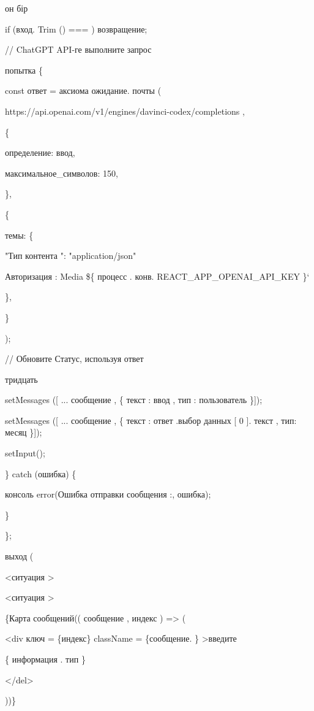 он бір

if (вход. Trim () === \textquotesingle\textquotesingle) возвращение;

// ChatGPT API-ге выполните запрос

попытка \{

const ответ = аксиома ожидание. почты (

\textquotesingle https://api.openai.com/v1/engines/davinci-codex/completions\textquotesingle{}
,

\{

определение: ввод,

максимальное\_символов: 150,

\},

\{

темы: \{

"Тип контента ": "application/json"

\textquotesingle Авторизация\textquotesingle{} : \textquotesingle Media
\$\{ процесс . конв. REACT\_APP\_OPENAI\_API\_KEY \}`

\},

\}

);

// Обновите Статус, используя ответ

тридцать

setMessages ({[} ... сообщение , \{ текст : ввод , тип :
\textquotesingle пользователь\textquotesingle{} \}{]});

setMessages ({[} ... сообщение , \{ текст : ответ .выбор данных {[} 0
{]}. текст , тип: \textquotesingle месяц\textquotesingle{} \}{]});

setInput(\textquotesingle\textquotesingle);

\} catch (ошибка) \{

консоль error(\textquotesingle\textquotesingle Ошибка отправки сообщения
:\textquotesingle, ошибка);

\}

\};

выход (

\textless ситуация \textgreater{}

\textless ситуация \textgreater{}

\{Карта сообщений(( сообщение , индекс ) =\textgreater{} (

\textless div ключ = \{индекс\} className = \{сообщение. \}
\textgreater введите

\{ информация . тип \}

\textless/del\textgreater{}

))\}

